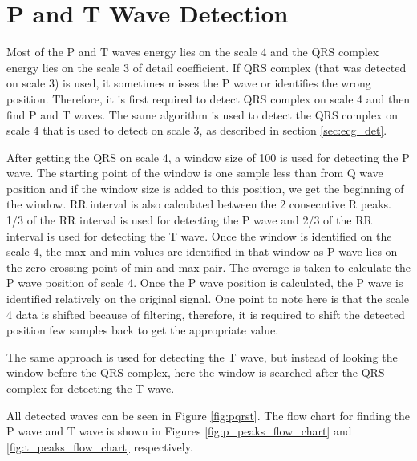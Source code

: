 \section{P and T Wave Detection}
Most of the P and T waves energy lies on the scale 4 and the QRS complex energy lies on the scale 3 of detail coefficient. If QRS complex (that was detected on scale 3) is used, it sometimes misses the P wave or identifies the wrong position. Therefore, it is first required to detect QRS complex on scale 4 and then find P and T waves. The same algorithm is used to detect the QRS complex on scale 4 that is used to detect on scale 3, as described in section \ref{sec:ecg_det}.

After getting the QRS on scale 4, a window size of 100 is used for detecting the P wave. The starting point of the window is one sample less than from Q wave position and if the window size is added to this position, we get the beginning of the window. RR interval is also calculated between the 2 consecutive R peaks. 1/3 of the RR interval is used for detecting the P wave and 2/3 of the RR interval is used for detecting the T wave. Once the window is identified on the scale 4, the max and min values are identified in that window as P wave lies on the zero-crossing point of min and max pair. The average is taken to calculate the P wave position of scale 4. Once the P wave position is calculated, the P wave is identified relatively on the original signal. One point to note here is that the scale 4 data is shifted because of filtering, therefore, it is required to shift the detected position few samples back to get the appropriate value.

The same approach is used for detecting the T wave, but instead of looking the window before the QRS complex, here the window is searched after the QRS complex for detecting the T wave.

All detected waves can be seen in Figure \ref{fig:pqrst}. The flow chart for finding the P wave and T wave is shown in Figures \ref{fig:p_peaks_flow_chart} and \ref{fig:t_peaks_flow_chart} respectively.


